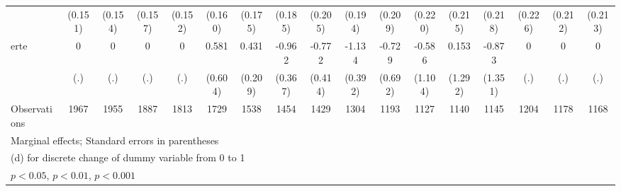 {\begin{tabular}{l*{16}{c}}
                    &     (0.151)         &     (0.154)         &     (0.157)         &     (0.152)         &     (0.160)         &     (0.175)         &     (0.185)         &     (0.205)         &     (0.194)         &     (0.209)         &     (0.220)         &     (0.215)         &     (0.218)         &     (0.226)         &     (0.212)         &     (0.213)         \\
[1em]
erte                &           0         &           0         &           0         &           0         &       0.581         &       0.431\sym{*}  &      -0.962\sym{**} &      -0.772         &      -1.134\sym{**} &      -0.729         &      -0.586         &       0.153         &      -0.873         &           0         &           0         &           0         \\
                    &         (.)         &         (.)         &         (.)         &         (.)         &     (0.604)         &     (0.209)         &     (0.367)         &     (0.414)         &     (0.392)         &     (0.692)         &     (1.104)         &     (1.292)         &     (1.351)         &         (.)         &         (.)         &         (.)         \\
\hline
Observations        &        1967         &        1955         &        1887         &        1813         &        1729         &        1538         &        1454         &        1429         &        1304         &        1193         &        1127         &        1140         &        1145         &        1204         &        1178         &        1168         \\
\hline\hline
\multicolumn{17}{l}{\footnotesize Marginal effects; Standard errors in parentheses}\\
\multicolumn{17}{l}{\footnotesize  (d) for discrete change of dummy variable from 0 to 1}\\
\multicolumn{17}{l}{\footnotesize \sym{*} \(p<0.05\), \sym{**} \(p<0.01\), \sym{***} \(p<0.001\)}\\
\end{tabular}
}

